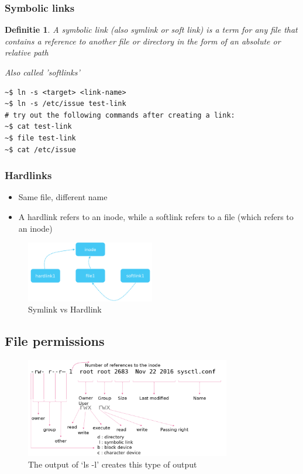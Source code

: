 \documentclass{article}
\newtheorem{theorem}{Definitie}[section]
\begin{document}
\subsubsection{Symbolic links}

\begin{theorem}
    A symbolic link (also symlink or soft link) is a term for any file that contains a reference to another file or directory in the form of an absolute or relative path

    Also called 'softlinks'
\end{theorem}

\begin{verbatim}
~$ ln -s <target> <link-name>
~$ ln -s /etc/issue test-link
# try out the following commands after creating a link:
~$ cat test-link
~$ file test-link
~$ cat /etc/issue
\end{verbatim}


\subsubsection{Hardlinks}

\begin{itemize}
    \item Same file, different name
    \item A hardlink refers to an inode, while a softlink refers to a file (which refers to an inode)
\end{itemize}

\begin{figure}[H]
    \centering
    \includegraphics[width=0.5\textwidth]{soft-vs-hard-links.png}
    \caption{Symlink vs Hardlink}
\end{figure}


\subsection{File permissions}

\begin{figure}[H]
    \centering
    \includegraphics[width=0.8\textwidth]{file-permissions.png}
    \caption{The output of `ls -l' creates this type of output}
\end{figure}
\end{document}
